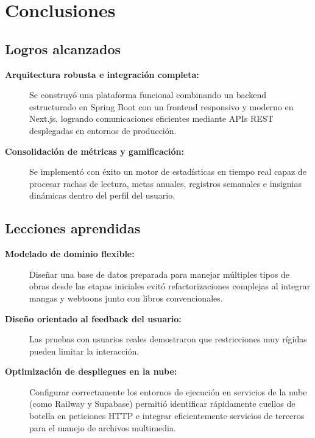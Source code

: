 \documentclass[12pt, atypical, journal]{article}
\begin{document}
\newpage

\section{Conclusiones}

\subsection{Logros alcanzados}
\begin{description}
	\item[\textbf{Arquitectura robusta e integración completa:}] 
	Se construyó una plataforma funcional combinando un backend estructurado en Spring Boot con un frontend responsivo y moderno en Next.js, logrando comunicaciones eficientes mediante APIs REST desplegadas en entornos de producción.
	
	\item[\textbf{Consolidación de métricas y gamificación:}] 
	Se implementó con éxito un motor de estadísticas en tiempo real capaz de procesar rachas de lectura, metas anuales, registros semanales e insignias dinámicas dentro del perfil del usuario.
\end{description}

\subsection{Lecciones aprendidas}
\begin{description}
	\item[\textbf{Modelado de dominio flexible:}] 
	Diseñar una base de datos preparada para manejar múltiples tipos de obras desde las etapas iniciales evitó refactorizaciones complejas al integrar mangas y webtoons junto con libros convencionales.
	
	\item[\textbf{Diseño orientado al feedback del usuario:}] 
	Las pruebas con usuarios reales demostraron que restricciones muy rígidas pueden limitar la interacción.
	
	\item[\textbf{Optimización de despliegues en la nube:}] 
	Configurar correctamente los entornos de ejecución en servicios de la nube (como Railway y Supabase) permitió identificar rápidamente cuellos de botella en peticiones HTTP e integrar eficientemente servicios de terceros para el manejo de archivos multimedia.
\end{description}
\end{document}
